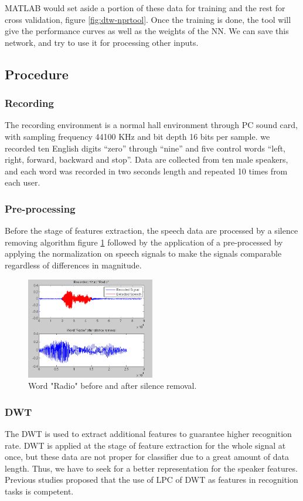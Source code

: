 \documentclass[12pt, a4paper, twoside]{report}
\begin{document}
MATLAB would set aside a portion of these data for training and the rest for cross validation, figure \ref{fig:dtw-nprtool}. Once the training is done, the tool will give the performance curves as well as the weights of the NN. We can save this network, and try to use it for processing other inputs.

\subsection{Procedure}
\subsubsection{Recording}
The recording environment is a normal hall environment through PC sound card, with sampling frequency 44100 KHz and bit depth 16 bits per sample. we recorded ten English digits “zero” through “nine” and five control words “left, right, forward, backward and stop”. Data are collected from ten male speakers, and each word was recorded in two seconds length and repeated 10 times from each user.
\subsubsection{Pre-processing}
Before the stage of features extraction, the speech data are processed by a silence removing algorithm figure \ref{fig:dtw-sremove} followed by the application of a pre-processed by applying the normalization on speech signals to make the signals comparable regardless of differences in magnitude.
\begin{figure}[!h]
	\centering
	\includegraphics[width=0.5\textwidth]
	{images/chapter5/dtw-sremove}
	\caption{Word "Radio" before and after silence removal.}
	\label{fig:dtw-sremove}
\end{figure}

\subsubsection{DWT}
The DWT is used to extract additional features to guarantee higher recognition rate. DWT is applied at the stage of feature extraction for the whole signal at once, but these data are not proper for classifier due to a great amount of data length. Thus, we have to seek for a better representation for the speaker features. Previous studies proposed that the use of LPC of DWT as features in recognition tasks is competent.
\end{document}
